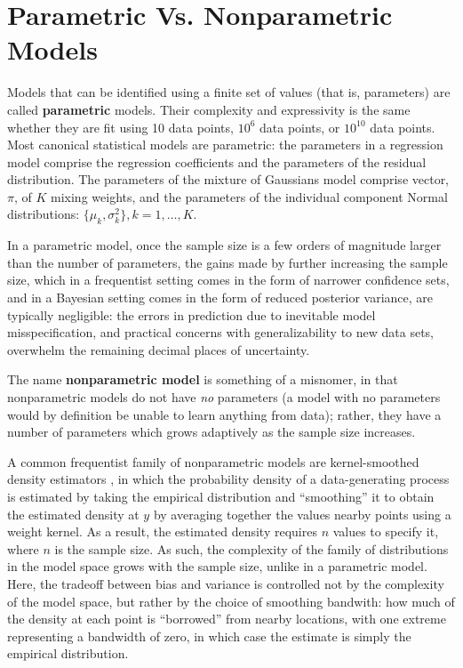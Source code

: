 \section{Parametric Vs. Nonparametric Models}
\label{sec:param-vs.-nonp}

Models that can be identified using a finite set of values
(that is, parameters) are called {\bf parametric} models.  Their
complexity and expressivity is the same whether they are fit using 10
data points, $10^6$ data points, or $10^10$ data points.  Most
canonical statistical models are parametric: the parameters in a
regression model comprise the regression coefficients and the
parameters of the residual distribution.  The parameters of the
mixture of Gaussians model comprise vector, $\pi$, of $K$ mixing weights,
and the parameters of the individual component Normal distributions:
$\{\mu_k, \sigma^2_k\}, k = 1, \dots, K$.

In a parametric model, once the sample size is a few orders of
magnitude larger than the number of parameters, the gains made by
further increasing the sample size, which in a frequentist setting
comes in the form of narrower confidence sets, and in a Bayesian
setting comes in the form of reduced posterior variance, are typically
negligible: the errors in prediction due to inevitable model misspecification, and
practical concerns with generalizability to new data sets, overwhelm
the remaining decimal places of uncertainty.

The name {\bf nonparametric model} is something of a misnomer, in that
nonparametric models do not have {\em no} parameters (a model with no
parameters would by definition be unable to learn anything from data);
rather, they have a number of parameters which grows adaptively as the
sample size increases.

A common frequentist family of nonparametric models are kernel-smoothed density
estimators \citep{rosenblatt1956remarks, parzen1962estimation}, 
in which the probability density of a data-generating process is
estimated by taking the empirical distribution and ``smoothing'' it to
obtain the estimated density at $y$ by
averaging together the values nearby points using a weight kernel.  As
a result, the estimated density requires $n$ values to specify it,
where $n$ is the sample size.  As such, the complexity of the family
of distributions in the model space grows with the sample size, unlike
in a parametric model.  Here, the tradeoff between bias and variance
is controlled not by the complexity of the model space, but rather by
the choice of smoothing bandwith: how much of the density at each
point is ``borrowed'' from nearby locations, with one extreme
representing a bandwidth of zero, in which case the estimate is simply
the empirical distribution.

